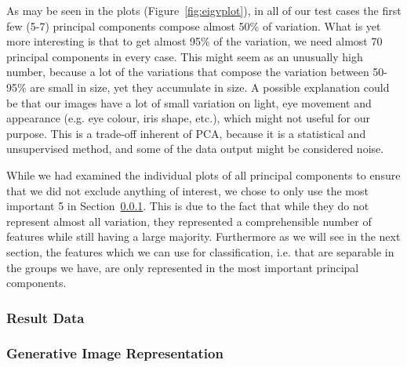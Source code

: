 As may be seen in the plots (Figure~\ref{fig:eigvplot}), in all of our test cases the first few (5-7) principal components compose almost
50\% of variation.
What is yet more interesting is that to get almost 95\% of the variation, we need almost 70 principal components in every case.
This might seem as an unusually high number, because a lot of the variations that compose the variation between 50-95\% are small in size, yet
they accumulate in size.
A possible explanation could be that our images have a lot of small variation on light, eye movement and appearance (e.g. eye colour, iris shape, etc.),
which might not useful for our purpose. This is a trade-off inherent of PCA, because it is a statistical and unsupervised method, and some of the data output
might be considered noise.

While we had examined the individual plots of all principal components to ensure that we did not exclude anything of interest, we chose to only use the most important 5 in Section~\ref{ssub:ResultData}.
This is due to the fact that while they do not represent almost all variation, they represented a comprehensible number of features while
still having a large majority. Furthermore as we will see in the next section, the features which we can use for classification, i.e. that are separable in the groups we have, are
only represented in the most important principal components.

\subsubsection{Result Data}
\label{ssub:ResultData}

\subsubsection{Generative Image Representation}
\label{ssub:GenerativeImageRepresentation}


